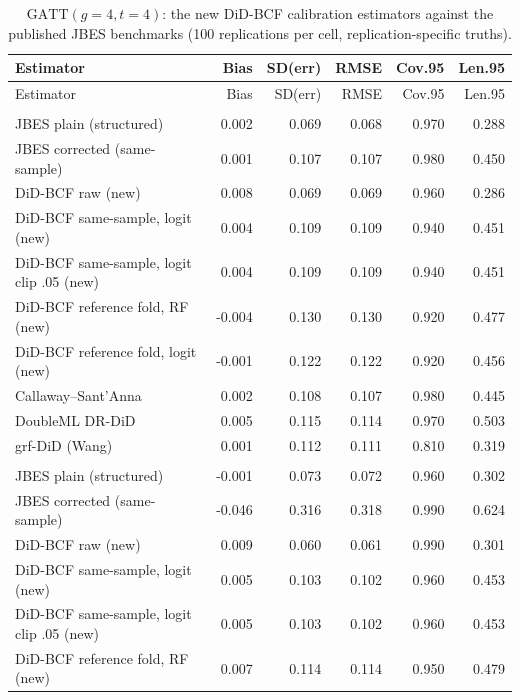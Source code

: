 {\footnotesize
\begin{longtable}{lrrrrr}
\caption{$\mathrm{GATT}(g{=}4,t{=}4)$: the new DiD-BCF calibration estimators against the published JBES benchmarks (100 replications per cell, replication-specific truths).}\label{tab:benchgatt800}\\
\toprule
Estimator & Bias & SD(err) & RMSE & Cov.95 & Len.95 \\
\midrule
\endfirsthead
\toprule
Estimator & Bias & SD(err) & RMSE & Cov.95 & Len.95 \\
\midrule
\endhead
\bottomrule
\endlastfoot
\multicolumn{6}{l}{\textit{baseline, $N=800$, degree $d=1$}} \\
\quad JBES plain (structured) & 0.002 & 0.069 & 0.068 & 0.970 & 0.288 \\
\quad JBES corrected (same-sample) & 0.001 & 0.107 & 0.107 & 0.980 & 0.450 \\
\quad DiD-BCF raw (new) & 0.008 & 0.069 & 0.069 & 0.960 & 0.286 \\
\quad DiD-BCF same-sample, logit (new) & 0.004 & 0.109 & 0.109 & 0.940 & 0.451 \\
\quad DiD-BCF same-sample, logit clip .05 (new) & 0.004 & 0.109 & 0.109 & 0.940 & 0.451 \\
\quad DiD-BCF reference fold, RF (new) & -0.004 & 0.130 & 0.130 & 0.920 & 0.477 \\
\quad DiD-BCF reference fold, logit (new) & -0.001 & 0.122 & 0.122 & 0.920 & 0.456 \\
\quad Callaway--Sant'Anna & 0.002 & 0.108 & 0.107 & 0.980 & 0.445 \\
\quad DoubleML DR-DiD & 0.005 & 0.115 & 0.114 & 0.970 & 0.503 \\
\quad grf-DiD (Wang) & 0.001 & 0.112 & 0.111 & 0.810 & 0.319 \\
\addlinespace
\multicolumn{6}{l}{\textit{baseline, $N=800$, degree $d=2$}} \\
\quad JBES plain (structured) & -0.001 & 0.073 & 0.072 & 0.960 & 0.302 \\
\quad JBES corrected (same-sample) & -0.046 & 0.316 & 0.318 & 0.990 & 0.624 \\
\quad DiD-BCF raw (new) & 0.009 & 0.060 & 0.061 & 0.990 & 0.301 \\
\quad DiD-BCF same-sample, logit (new) & 0.005 & 0.103 & 0.102 & 0.960 & 0.453 \\
\quad DiD-BCF same-sample, logit clip .05 (new) & 0.005 & 0.103 & 0.102 & 0.960 & 0.453 \\
\quad DiD-BCF reference fold, RF (new) & 0.007 & 0.114 & 0.114 & 0.950 & 0.479 \\

\end{longtable}}
